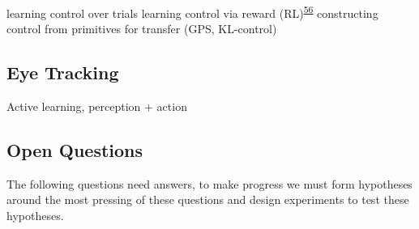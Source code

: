 \documentclass[
  a4paper,
]{article}
\begin{document}
learning control over trials learning control via reward
(RL)\textsuperscript{\protect\hyperlink{ref-vanderkooijLearningReachTrajectory2021}{56}}
constructing control from primitives for transfer (GPS, KL-control)

\hypertarget{eye-tracking}{%
\subsection{Eye Tracking}\label{eye-tracking}}

Active learning, perception + action

\hypertarget{open-questions}{%
\subsection{Open Questions}\label{open-questions}}

The following questions need answers, to make progress we must form
hypotheses around the most pressing of these questions and design
experiments to test these hypotheses.
\end{document}
